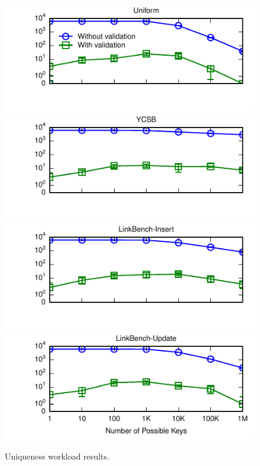 \begin{figure}
\includegraphics[width=\columnwidth]{figs/pk-workload-uniform-violations.pdf}\vspace{-2em}
\includegraphics[width=\columnwidth]{figs/pk-workload-ycsb-violations.pdf}\vspace{-2em}
\includegraphics[width=\columnwidth]{figs/pk-workload-linkbench-ins-violations.pdf}\vspace{-2em}
\includegraphics[width=\columnwidth]{figs/pk-workload-linkbench-upd-violations.pdf}\vspace{-1em}
\caption{Uniqueness workload results.}
\label{fig:pk-workload}
\end{figure}



